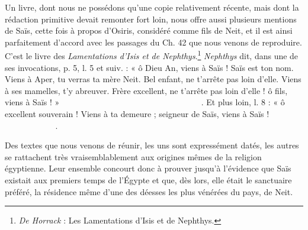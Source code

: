 \documentclass[a4paper, 11pt, oneside]{article}
\newcommand*\hieroAAAD{}
\newcommand*\hieroAAAG{}
\newcommand*\hieroAAAH{}
\newcommand*\hieroAAAI{}
\newcommand*\hieroAAAW{\raisebox{0.5ex}{}}
\newcommand*\hieroAABR{}
\newcommand*\hieroAACD{}
\newcommand*\hieroAACM{}
\newcommand*\hieroAACY{}
\newcommand*\hieroAADB{}
\newcommand*\hieroAADC{\raisebox{0.5ex}{}}
\newcommand*\hieroAADF{}
\newcommand*\hieroAADG{}
\newcommand*\hieroAADW{}
\newcommand*\hieroAAEL{}
\newcommand*\hieroAAEM{}
\newcommand*\hieroAAEN{}
\newcommand*\hieroAAEO{}
\newcommand*\hieroAAEP{\raisebox{0.5ex}{}}
\newcommand*\hieroAAEQ{}
\newcommand*\hieroAAER{}
\newcommand*\hieroAAES{\raisebox{0.5ex}{}}
\newcommand*\hieroAAET{}
\newcommand*\hieroAAEU{}
\newcommand*\hieroAAEV{}
\newcommand*\hieroAAEW{}
\newcommand*\hieroAAEX{}
\newcommand*\hieroAAEY{}
\newcommand*\hieroAAEZ{}
\newcommand*\hieroAAFA{}
\newcommand*\hieroAAFB{}
\newcommand*\hieroAAFC{}
\newcommand*\hieroAAFD{}
\newcommand*\hieroAAFE{}
\newcommand*\hieroAAFF{}
\newcommand*\hieroAAFG{}
\newcommand*\hieroAAFH{}
\newcommand*\hieroAAFI{}
\newcommand*\hieroAAFJ{}
\newcommand*\hieroAAFK{\raisebox{0.3ex}{}}
\newcommand*\hieroAAFL{}
\newcommand*\hieroAAFM{}
\newcommand*\hieroAAFN{\raisebox{0.5ex}{}}
\newcommand*\hieroAAFO{}
\newcommand*\hieroAAFP{}
\newcommand*\hieroAAFQ{}
\newcommand*\hieroAAFR{}
\newcommand*\hieroAAFS{}
\newcommand*\hieroAAFT{}
\newcommand*\hieroAAFU{}
\newcommand*\hieroAAFV{}
\begin{document}
Un livre, dont nous ne possédons qu'une copie relativement récente, mais dont la rédaction primitive devait remonter fort loin, nous offre aussi plusieurs mentions de Saïs, cette fois à propos d'Osiris, considéré comme fils de Neit, et il est ainsi parfaitement d'accord avec les passages du Ch. 42 que nous venons de reproduire. C'est le livre des \emph{Lamentations d'Isis et de Nephthys}.\footnote{\emph{De Horrack} : Les Lamentations d'Isis et de Nephthys.} \emph{Nephthys} dit, dans une de ses invocations, p. 5, l. 5 et suiv. : « ô Dieu An, viens à Saïs ! Saïs est ton nom. Viens à Aper, tu verras ta mère Neit. Bel enfant, ne t'arrête pas loin d'elle. Viens à ses mamelles, t'y abreuver. Frère excellent, ne t'arrête pas loin d'elle ! ô fils, viens à Saïs ! » $\hieroAAEL\:\hieroAAEM\:\hieroAADG\allowbreak\:\hieroAAEN\:\hieroAAEO\:\hieroAAEP\allowbreak\:\hieroAAAD\:\hieroAAEQ\:\hieroAADC\allowbreak\:\hieroAAAW\:\hieroAAAD\:\hieroAAAG\allowbreak\:\hieroAADC\:\hieroAAAW\:\hieroAAFU\allowbreak\:\hieroAACM\:\hieroAAER\:\hieroAADB\allowbreak\:\hieroAAES\:\hieroAADG\:\hieroAAEN\allowbreak\:\hieroAAET\:\hieroAAEU\:\hieroAAAW\allowbreak\:\hieroAAEV\:\hieroAAEW\:\hieroAACY\allowbreak\:\hieroAAES\:\hieroAAEX\:\hieroAAEY\allowbreak\:\hieroAAEZ\:\hieroAAFA\:\hieroAAFB\allowbreak\:\hieroAAEM\:\hieroAADW\:\hieroAAFC\allowbreak\:\hieroAAFD\:\hieroAAFE\:\hieroAAFF\allowbreak\:\hieroAADG\:\hieroAAAH\:\hieroAAFG\allowbreak\:\hieroAAFH\:\hieroAAFI\:\hieroAAFJ\allowbreak\:\hieroAAFD\:\hieroAAFK\:\hieroAAEZ\allowbreak\:\hieroAACM\:\hieroAAFL\:\hieroAAFM\allowbreak\:\hieroAAAH\:\hieroAABR\:\hieroAAFN\allowbreak\:\hieroAAFO\:\hieroAAAH\:\hieroAADB\allowbreak\:\hieroAAFB\:\hieroAAEM\:\hieroAADW\allowbreak\:\hieroAAFC\:\hieroAAFD\:\hieroAAFE\allowbreak\:\hieroAAFF\:\hieroAAAH\:\hieroAADF\allowbreak\:\hieroAAAI\:\hieroAADB\:\hieroAADG\allowbreak\:\hieroAAAH\:\hieroAAEO\allowbreak\:\hieroAAEP\:\hieroAAAD\allowbreak\:\hieroAAEQ\:\hieroAADC\:\hieroAAFP$. Et plus loin, l. 8 : « ô excellent souverain ! Viens à ta demeure ; seigneur de Saïs, viens à Saïs ! $\hieroAAAH\:\hieroAADF\:\hieroAAAH\allowbreak\:\hieroAACD\:\hieroAAAH\:\hieroAAAH\allowbreak\:\hieroAAFQ\:\hieroAADB\:\hieroAAFB\allowbreak\:\hieroAAFV\:\hieroAADG\:\hieroAAAH\:\hieroAAEO\allowbreak\:\hieroAAEP\:\hieroAAFR\:\hieroAAFS\:\hieroAAAD\allowbreak\:\hieroAAEQ\:\hieroAADC\:\hieroAAFT\:\hieroAADG\allowbreak\:\hieroAAAH\:\hieroAAEO\:\hieroAAEP\allowbreak\:\hieroAAAD\:\hieroAAAG\:\hieroAADC\:\hieroAAFT$.

Des textes que nous venons de réunir, les uns sont expressément datés, les autres se rattachent très vraisemblablement aux origines mêmes de la religion égyptienne. Leur ensemble concourt donc à prouver jusqu'à l'évidence que Saïs existait aux premiers temps de l'Égypte et que, dès lors, elle était le sanctuaire préféré, la résidence même d'une des déesses les plus vénérées du pays, de Neit.
\end{document}
